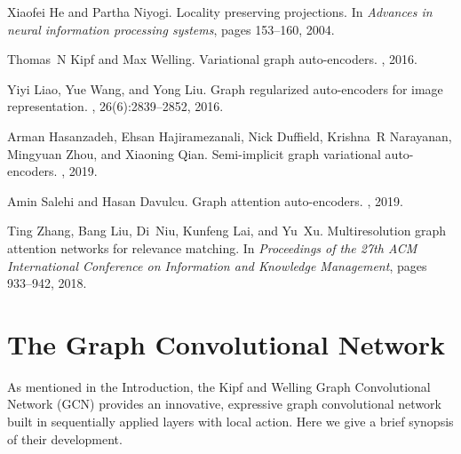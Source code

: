 \documentclass[12pt,reqno]{article}
\begin{document}
\begin{thebibliography}{10}
Xiaofei He and Partha Niyogi.
\newblock Locality preserving projections.
\newblock In {\em Advances in neural information processing systems}, pages
153--160, 2004.

Thomas~N Kipf and Max Welling.
\newblock Variational graph auto-encoders.
, 2016.

Yiyi Liao, Yue Wang, and Yong Liu.
\newblock Graph regularized auto-encoders for image representation.
, 26(6):2839--2852,
2016.

Arman Hasanzadeh, Ehsan Hajiramezanali, Nick Duffield, Krishna~R Narayanan,
Mingyuan Zhou, and Xiaoning Qian.
\newblock Semi-implicit graph variational auto-encoders.
, 2019.

Amin Salehi and Hasan Davulcu.
\newblock Graph attention auto-encoders.
, 2019.

Ting Zhang, Bang Liu, Di~Niu, Kunfeng Lai, and Yu~Xu.
\newblock Multiresolution graph attention networks for relevance matching.
\newblock In {\em Proceedings of the 27th ACM International Conference on
Information and Knowledge Management}, pages 933--942, 2018.

\end{thebibliography}
\appendix
\section{The Graph Convolutional Network} \label{app:gcn}
As mentioned in the Introduction, the Kipf and Welling Graph Convolutional Network (GCN) \cite{kipf2016semi} provides an innovative, expressive graph convolutional network built in sequentially applied layers with local action.
Here we give a brief synopsis of their development.
\end{document}
